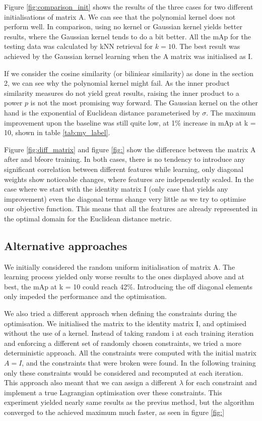 \documentclass[10pt,technote]{IEEEtran}
\begin{document}
Figure \ref{fig:comparison_init} shows the results of the three cases for two different initialisations of matrix A. We can see that the polynomial kernel does not perform well. In comparison, using no kernel or Gaussian kernel yields better results, where  the Gaussian kernel tends to do a bit better.
All the mAp for the testing data was calculated by kNN retrieval for $k = 10$.
The best result was achieved by the Gaussian kernel learning when the A matrix was initialised as I.

If we consider the cosine similarity (or biliniear similarity) as done in the section 2, we can see why the polynomial kernel might fail. As the inner product similarity measures do not yield great results, raising the inner product to a power $p$ is not the most promising way forward. The Gaussian kernel on the other hand is the exponential of Euclidean distance parameterised by $\sigma$. The maximum improvement upon the baseline was still quite low, at 1\% increase in mAp at k = 10, shown in table \ref{tab:my_label}.

Figure \ref{fig:diff_matrix} and figure \ref{fig:} show the difference between the matrix A after and bfeore training. In both cases, there is no tendency to introduce any significant correlation between different features while learning, only diagonal weights show noticeable changes, where features are independently scaled. In the case where we start with the identity matrix I (only case that yields any improvement) even the diagonal terms change very little as we try to optimise our objective function. This means that all the features are already represented in the optimal domain for the Euclidean distance metric.

\subsection{Alternative approaches}
We initially considered the random uniform initialisation of matrix A. The learning process yielded only worse results to the ones displayed above and at best, the mAp at k = 10 could reach 42\%. Introducing the off diagonal elements only impeded the performance and the optimisation.

We also tried a different approach when defining the constraints during the optimisation. We initialised the matrix to the identity matrix I, and optimised without the use of a kernel. Instead of taking random i at each training iteration and enforcing a different set of randomly chosen constraints, we tried a more deterministic approach. All the constraints were computed with the initial matrix $A=I$, and the constraints that were broken were found. In the following training only these constraints would be considered and recomputed at each iteration. This approach also meant that we can assign a different $\lambda$ for each constraint and implement a true Lagrangian optimisation over these constraints. This experiment yielded nearly same results as the previus method, but the algorithm converged to the achieved maximum much faster, as seen in figure \ref{fig:}
\end{document}
